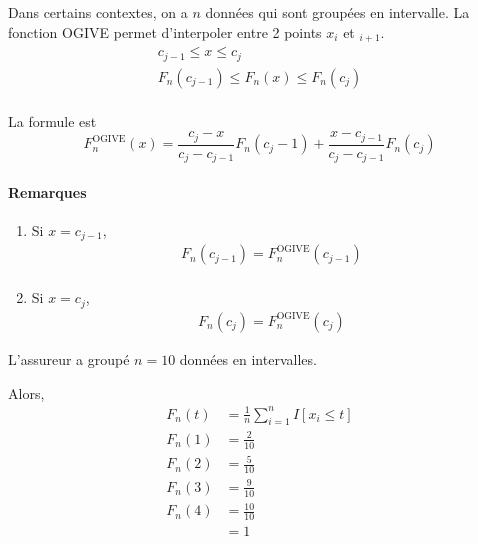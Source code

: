 \documentclass[12pt, french]{report}
\begin{document}
Dans certains contextes, on a $n$ données qui sont groupées en intervalle. La fonction OGIVE permet d'interpoler entre 2 points $x_i$ et $_{i+1}$.
\begin{align*}
c_{j-1} 	 \leq x  \leq c_j \\
F_n(c_{j-1})	 \leq F_n(x)	 \leq F_n(c_j) \\
\end{align*}


La formule est
\begin{equation}
\label{eq:repart-OGIVE}
F_n^{\text{OGIVE}}(x) = \frac{c_j - x}{c_j - c_{j-1}} F_n(c_j -1) + \frac{x - c_{j-1}}{c_j - c_{j-1}} F_n(c_j)
\end{equation}
\paragraph{Remarques}
\begin{enumerate}[label=(\arabic*)]
\item Si $x = c_{j-1}$,
\begin{align*}
F_n(c_{j-1}) = F_n^{\text{OGIVE}}(c_{j-1}) \\
\end{align*}
\item Si $x = c_j$,
\begin{align*}
F_n(c_j) = F_n^{\text{OGIVE}}(c_j)
\end{align*}
\end{enumerate}

\begin{exemple}
L'assureur a groupé $n=10$ données en intervalles.
\begin{center}
\end{center}
Alors,
\begin{align*}
F_n(t)	& = \frac{1}{n} \sum_{i=1}^{n} I[x_i \leq t] \\
F_n(1)	& = \frac{2}{10} \\
F_n(2)	& = \frac{5}{10} \\
F_n(3)	& = \frac{9}{10} \\
F_n(4)	& = \frac{10}{10} \\
		& = 1 \\
\end{align*}
\end{exemple}
\end{document}
